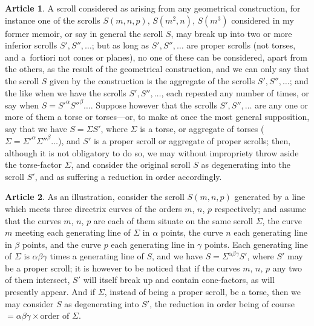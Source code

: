 \documentclass[12pt,a4paper]{article}
\theoremstyle{definition}
\newtheorem{art}{Article}[section]
\begin{document}
\begin{art}
A scroll considered as arising from any geometrical construction, for instance one of the scrolls $S(m, n, p)$, $S(m^2, n)$, $S(m^3)$ considered in my former memoir, or say in general the scroll $S$, may break up into two or more inferior scrolls $S', S'', \ldots$; but as long as $S', S'', \ldots$ are proper scrolls (not torses, and a~fortiori not cones or planes), no one of these can be considered, apart from the others, as the result of the geometrical construction, and we can only say that the scroll $S$ given by the construction is the aggregate of the scrolls $S', S'', \ldots$; and the like when we have the scrolls $S', S'', \ldots$, each repeated any number of times, or say when $S = S'^\alpha S''^\beta \ldots$. Suppose however that the scrolls $S', S'', \ldots$ are any one or more of them a torse or torses---or, to make at once the most general supposition, say that we have $S = \Sigma S'$, where $\Sigma$ is a torse, or aggregate of torses ($\Sigma = \Sigma'^\alpha \Sigma''^\beta \ldots$), and $S'$ is a proper scroll or aggregate of proper scrolls; then, although it is not obligatory to do so, we may without impropriety throw aside the torse-factor $\Sigma$, and consider the original scroll $S$ as degenerating into the scroll $S'$, and as suffering a reduction in order accordingly.
\end{art}

\begin{art}
As an illustration, consider the scroll $S(m, n, p)$ generated by a line which meets three directrix curves of the orders $m$, $n$, $p$ respectively; and assume that the curves $m$, $n$, $p$ are each of them situate on the same scroll $\Sigma$, the curve $m$ meeting each generating line of $\Sigma$ in $\alpha$ points, the curve $n$ each generating line in $\beta$ points, and the curve $p$ each generating line in $\gamma$ points. Each generating line of $\Sigma$ is $\alpha\beta\gamma$ times a generating line of $S$, and we have $S = \Sigma^{\alpha\beta\gamma} S'$, where $S'$ may be a proper scroll; it is however to be noticed that if the curves $m$, $n$, $p$ any two of them intersect, $S'$ will itself break up and contain cone-factors, as will presently appear. And if $\Sigma$, instead of being a proper scroll, be a torse, then we may consider $S$ as degenerating into $S'$, the reduction in order being of course $= \alpha\beta\gamma \times \text{order of } \Sigma$.
\end{art}
\end{document}

